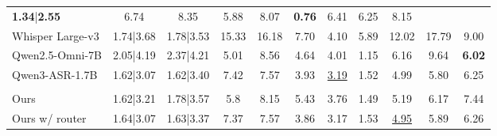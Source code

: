 \documentclass{article}
\begin{document}
\begin{table}[t]
\begin{tabular}{lcccccccccc}
\textbf{1.34}|\textbf{2.55} &
6.74 &
8.35 &
5.88 &
8.07 &
\textbf{0.76} &
6.41 &
6.25 &
8.15 \\
Whisper Large-v3 &
1.74|3.68 &
1.78|3.53 &
15.33 &
16.18 &
7.70 &
4.10 &
5.89 &
12.02 &
17.79 &
9.00 \\
Qwen2.5-Omni-7B &
2.05|4.19 &
2.37|4.21 &
5.01 &
8.56 &
4.64 &
4.01 &
1.15 &
6.16 &
9.64 &
\textbf{6.02} \\
Qwen3-ASR-1.7B &
1.62|3.07 &
1.62|3.40 &
7.42 &
7.57 &
3.93 &
\underline{3.19} &
1.52 &
4.99 &
5.80 &
6.25 \\
\rowcolor{headerblue}
\multicolumn{11}{l}{\textit{Our model}} \\
Ours &
1.62|3.21 &
1.78|3.57 &
5.8 &
8.15 &
5.43 &
3.76 &
1.49 &
5.19 &
6.17 &
7.44 \\
Ours w/ router &
1.64|3.07 &
1.63|3.37 &
7.37 &
7.57 &
3.86 &
3.17 &
1.53 &
\underline{4.95} &
5.89 &
6.26 \\
\bottomrule
\end{tabular}










\end{table}
\end{document}
